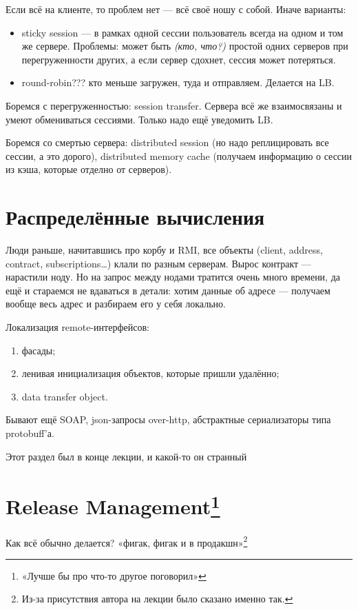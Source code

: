 \documentclass[11pt,a4paper]{article}
\begin{document}
Если всё на клиенте, то проблем нет — всё своё ношу с собой. Иначе варианты:
\begin{itemize}
\item sticky session — в рамках одной сессии пользователь всегда на одном и том же сервере. Проблемы: может быть \textit{(кто, что?)} простой одних серверов при перегруженности других, а если сервер сдохнет, сессия может потеряться.
\item round-robin??? кто меньше загружен, туда и отправляем. Делается на LB.
\end{itemize}

Боремся с перегруженностью: session transfer. Сервера всё же взаимосвязаны и умеют обмениваться сессиями. Только надо ещё уведомить LB.

Боремся со смертью сервера: distributed session (но надо реплицировать все сессии, а это дорого), distributed memory cache (получаем информацию о сессии из кэша, которые отделно от серверов).

\section{Распределённые вычисления}
Люди раньше, начитавшись про корбу и RMI, все объекты (client, address, contract, subscriptions…) клали по разным серверам. Вырос контракт — нарастили ноду. Но на запрос между нодами тратится очень много времени, да ещё и стараемся не вдаваться в детали: хотим данные об адресе — получаем вообще весь адрес и разбираем его у себя локально.

Локализация remote-интерфейсов:
\begin{enumerate}
\item фасады;
\item ленивая инициализация объектов, которые пришли удалённо;
\item data transfer object.
\end{enumerate}

Бывают ещё SOAP, json-запросы over-http, абстрактные сериализаторы типа protobuff'а.

Этот раздел был в конце лекции, и какой-то он странный

\section{Release Management\footnote{«Лучше бы про что-то другое поговорил»}}
Как всё обычно делается? «фигак, фигак и в продакшн»\footnote{Из-за присутствия автора на лекции было сказано именно так.}
\end{document}
